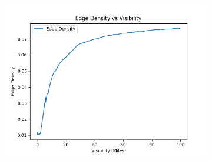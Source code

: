 \begin{figure}
    \centering
    \begin{subfigure}[b]{0.4\textwidth}
        \includegraphics[width=\textwidth]{imgs/edge_density_vs_visibility.png}
    

\end{subfigure}
\end{figure}
